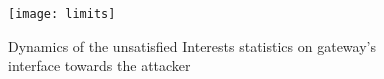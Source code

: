 \begin{figure}[htbp]
  \centering
  \texttt{[image: limits]}
  \caption{Dynamics of the unsatisfied Interests statistics on gateway's interface towards the attacker}
  \label{fig:ratio example}
\end{figure}



